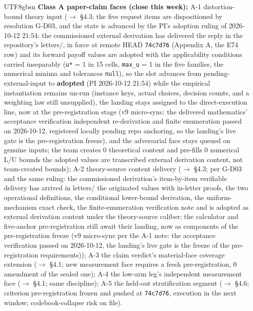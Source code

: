 \documentclass[11pt,letterpaper]{article}
\begin{document}
\begin{CJK}{UTF8}{gbsn}
\textbf{Class A \textemdash{} paper-claim faces (close this week):} A-1 distortion-bound theory input (\ensuremath{\to} \S{}4.3; the five request items are dispositioned by resolution G-D03, and the state is advanced by the PI's adoption ruling of 2026-10-12 21:54: the commissioned external derivation has delivered \textemdash{} the reply in the repository's letters/, in force at remote HEAD \texttt{74c7d76} (Appendix A, the E74 row) \textemdash{} and its forward payoff values are adopted with the applicability conditions carried inseparably (\texttt{u*} = 1 in 15 cells, \texttt{max\_u} = 1 in the five families, the numerical minima and tolerances \texttt{null}), so the slot advances from pending-external-input to \textbf{adopted} (PI 2026-10-12 21:54) while the empirical instantiation remains un-run (instance keys, actual choices, decision counts, and a weighting law still unsupplied), the landing stays assigned to the direct-execution line, now at the pre-registration stage (v9 micro-sync: the delivered mathematics' acceptance verification \textemdash{} independent re-derivation and finite enumeration \textemdash{} passed on 2026-10-12, registered locally pending repo anchoring, so the landing's live gate is the pre-registration freeze), and the adversarial face stays queued on genuine inputs; the team creates 0 theoretical content and pre-fills 0 numerical L/U bounds \textemdash{} the adopted values are transcribed external derivation content, not team-created bounds); A-2 theory-source content delivery (\ensuremath{\to} \S{}4.3; per G-D03 and the same ruling: the commissioned derivation's item-by-item verifiable delivery has arrived in letters/ \textemdash{} the originated values with in-letter proofs, the two operational definitions, the conditional lower-bound derivation, the uniform-mechanism exact check, the finite-enumeration verification note \textemdash{} and is adopted as external derivation content under the theory-source caliber; the calculator and five-anchor pre-registration still await their landing, now as components of the pre-registration freeze (v9 micro-sync per the A-1 note: the acceptance verification passed on 2026-10-12, the landing's live gate is the freeze of the pre-registration requirements)); A-3 the claim verdict's material-face coverage extension (\ensuremath{\to} \S{}4.1; new measurement face requires a fresh pre-registration, 0 amendment of the sealed one); A-4 the low-arm leg's independent measurement face (\ensuremath{\to} \S{}4.1; same discipline); A-5 the held-out stratification segment (\ensuremath{\to} \S{}4.6; criterion pre-registration frozen and pushed at \texttt{74c7d76}, execution in the next window; codebook-collapse risk on file).


\end{CJK}
\end{document}
